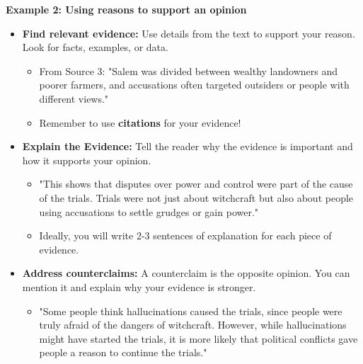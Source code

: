 \documentclass[12pt]{article}
\begin{document}
\begin{tcolorbox}[colframe=black!60, colback=white, 
coltitle=black, colbacktitle=black!15, fonttitle=\bfseries\Large, 
title=Examples, halign title=center, left=10pt, right=10pt, top=10pt, bottom=15pt]

\textbf{Example 2: Using reasons to support an opinion}
\begin{itemize}

                      \item \textbf{Find relevant evidence:} Use details from the text to support your reason. Look for facts, examples, or data. 
                      \begin{itemize}
                          \item  From Source 3: "Salem was divided between wealthy landowners and poorer farmers, and accusations often targeted outsiders or people with different views."
                          \item Remember to use \textbf{citations} for your evidence!

                      \end{itemize}


            \item \textbf{Explain the Evidence:} Tell the reader why the evidence is important and how it supports your opinion.
            \begin{itemize}
                \item  "This shows that disputes over power and control were part of the cause of the trials. Trials were not just about witchcraft but also about people using accusations to settle grudges or gain power."
                \item Ideally, you will write 2-3 sentences of explanation for each piece of evidence.
            \end{itemize}
\item \textbf{Address counterclaims:} A counterclaim is the opposite opinion. You can mention it and explain why your evidence is stronger.
\begin{itemize}
    \item "Some people think hallucinations caused the trials, since people were truly afraid of the dangers of witchcraft. However, while hallucinations might have started the trials, it is more likely that political conflicts gave people a reason to continue the trials." 
\end{itemize}




\end{itemize}
\end{tcolorbox}
\end{document}
